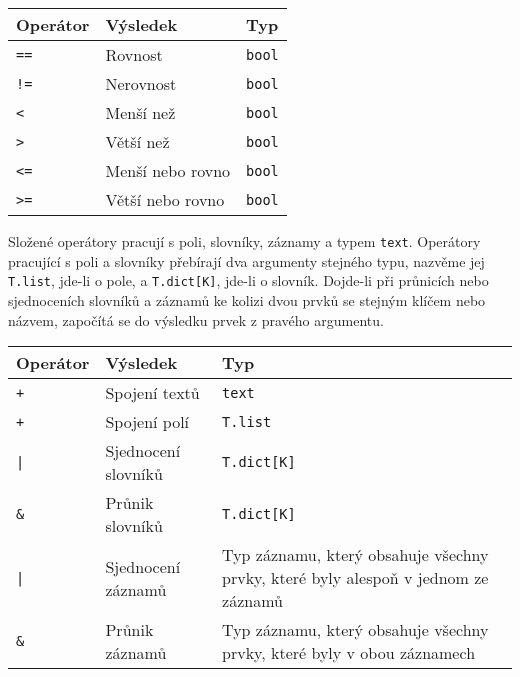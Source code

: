 \documentclass[a4paper,12pt]{article}
\begin{document}
\begin{tabular}{|m{1.5cm} m{5cm} m{8cm}|}\hline
Operátor & Výsledek & Typ\\\hline
\texttt{==} & Rovnost & \texttt{bool}\\\hline
\texttt{!=} & Nerovnost & \texttt{bool}\\\hline
\texttt{<} & Menší než & \texttt{bool}\\\hline
\texttt{>} & Větší než & \texttt{bool}\\\hline
\texttt{<=} & Menší nebo rovno & \texttt{bool}\\\hline
\texttt{>=} & Větší nebo rovno &\texttt{bool}\\\hline
\end{tabular}

Složené operátory pracují s poli, slovníky, záznamy a typem \texttt{text}. Operátory pracující s poli a slovníky přebírají dva argumenty stejného typu, nazvěme jej \texttt{T.list}, jde-li o pole, a \texttt{T.dict[K]}, jde-li o slovník. Dojde-li při průnicích nebo sjednoceních slovníků a záznamů ke kolizi dvou prvků se stejným klíčem nebo názvem, započítá se do výsledku prvek z pravého argumentu.

\begin{tabular}{|m{1.5cm} m{5cm} m{8cm}|}\hline
Operátor & Výsledek & Typ\\\hline
\texttt{+} & Spojení textů & \texttt{text}\\\hline
\texttt{+} & Spojení polí & \texttt{T.list}\\\hline
\texttt{|} & Sjednocení slovníků & \texttt{T.dict[K]}\\\hline
\texttt{\&} & Průnik slovníků & \texttt{T.dict[K]}\\\hline
\texttt{|} & Sjednocení záznamů & Typ záznamu, který obsahuje všechny prvky, které byly alespoň v jednom ze záznamů\\\hline
\texttt{\&} & Průnik záznamů & Typ záznamu, který obsahuje všechny prvky, které byly v obou záznamech\\\hline
\end{tabular}
\end{document}
